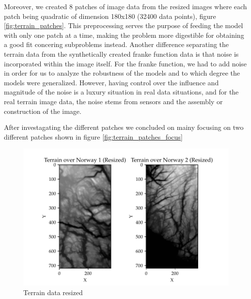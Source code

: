 \documentclass[11pt, a4paper]{article}
\begin{document}
Moreover, we created 8 patches of image data from the resized images where each patch being quadratic of dimension 180x180 (32400 data points), figure \ref{fig:terrain_patches}. This preprocessing serves the purpose of feeding the model with only one patch at a time, making the problem more digestible for obtaining a good fit concering subproblems instead. 
Another difference separating the terrain data from the synthetically created franke function data is that noise is incorporated within the image itself. For the franke function, we had to add noise in order for us to analyze the robustness of the models and to which degree the models were generalized. 
However, having control over the influence and magnitude of the noise is a luxury situation in real data situations, and for the real terrain image data, the noise stems from sensors and the assembly or construction of the image. 

After investagating the different patches we concluded on mainy focusing on two different patches shown in figure \ref{fig:terrain_patches_focus} 

\begin{figure}
  \centering
  \includegraphics[scale=0.75]{figures/EX6_terrain_data_resized.pdf}
  \caption{Terrain data resized}
  \label{fig:terrain_resized}
\end{figure}
\end{document}
